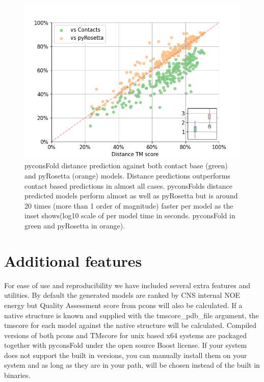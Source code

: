 \documentclass{bioinfo}
\begin{document}
\begin{figure}%
  \centerline{\includegraphics[width=\linewidth]{pyconsFold_figure}}
\caption{pyconsFold distance prediction against both contact base (green) and pyRosetta (orange) models. Distance predictions outperforms contact based predictions in almost all cases. pyconsFolds distance predicted models perform almost as well as pyRosetta but is around 20 times (more than 1 order of magnitude) faster per model as the inset shows(log10 scale of per model time in seconds. pyconsFold in green and pyRosetta in orange).}\label{fig:01}
\end{figure}

\section{Additional features}
For ease of use and reproducibility we have included several extra features and utilities. By default the generated models are ranked by CNS internal NOE energy but Quality Assessment score from pcons \cite{Lundstrom2008-wa} will also be calculated. If a native structure is known and supplied with the tmscore\_pdb\_file argument, the tmscore \cite{Zhang2007-xu,Xu2010-vu} for each model against the native structure will be calculated. 
Compiled versions of both pcons and TMscore for unix based x64 systems are packaged together with pyconsFold under the open source Boost license. If your system does not support the built in versions, you can manually install them on your system and as long as they are in your path, will be chosen instead of the built in binaries.
\end{document}
